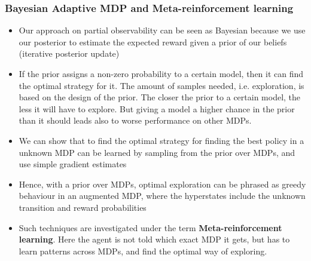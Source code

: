 \subsubsection{Bayesian Adaptive MDP and Meta-reinforcement learning}
\begin{itemize}
	\item Our approach on partial observability can be seen as Bayesian because we use our posterior to estimate the expected reward given a prior of our beliefs (iterative posterior update)
	\item If the prior assigns a non-zero probability to a certain model, then it can find the optimal strategy for it. The amount of samples needed, i.e. exploration, is based on the design of the prior. The closer the prior to a certain model, the less it will have to explore. But giving a model a higher chance in the prior than it should leads also to worse performance on other MDPs.
	\item We can show that to find the optimal strategy for finding the best policy in a unknown MDP can be learned by sampling from the prior over MDPs, and use simple gradient estimates
	\item Hence, with a prior over MDPs, optimal exploration can be phrased as greedy behaviour in an augmented MDP, where the hyperstates include the unknown transition and reward probabilities
	\item Such techniques are investigated under the term \textbf{Meta-reinforcement learning}. Here the agent is not told which exact MDP it gets, but has to learn patterns across MDPs, and find the optimal way of exploring.
\end{itemize}
